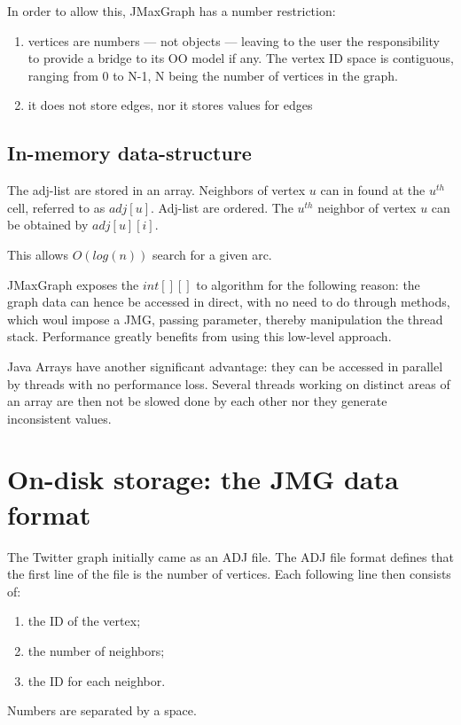 \documentclass[11pt,a4paper]{article}
\begin{document}
In order to allow this, JMaxGraph has a number restriction:

\begin{enumerate}
\item vertices are numbers --- not objects --- leaving to the user the responsibility to provide a bridge to its OO model if any.
The vertex ID space is contiguous, ranging from 0 to N-1, N being the number of vertices in the graph.
\item it does not store edges, nor it stores values for edges
\end{enumerate}


\subsection{In-memory data-structure}

The adj-list are stored in an array. Neighbors of vertex $u$ can in found at the $u^{th}$ cell, referred to as $adj[u]$.
Adj-list are ordered. The $u^{th}$ neighbor of vertex $u$ can be obtained by $adj[u][i]$.

This allows $O(log(n))$ search for a given arc.

JMaxGraph exposes the $int[][]$ to algorithm for the following reason: the graph data can hence be accessed in direct, with no need to do through methods, which woul impose a JMG, passing parameter, thereby manipulation the thread stack. Performance greatly benefits from using this low-level approach.

Java Arrays have another significant advantage: they can be accessed in parallel by threads with no performance loss. Several threads working on distinct areas of an array are then not be slowed done by each other nor they generate inconsistent values.

\section{On-disk storage: the JMG data format}

The Twitter graph initially came as an ADJ file. The ADJ file format defines that the first line of the file is the number of vertices. Each following line then consists of:
\begin{enumerate}
\item the ID of the vertex;
\item the number of neighbors;
\item the ID for each neighbor.
\end{enumerate}
Numbers are separated by a space.
\end{document}
